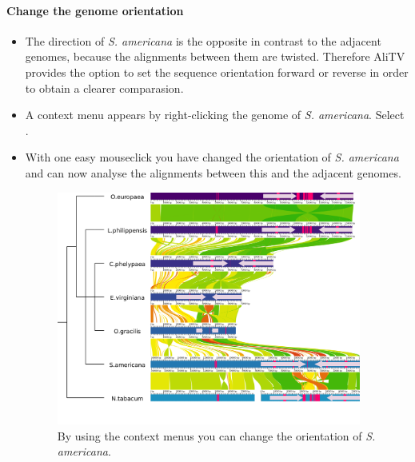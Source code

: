 \documentclass[a4paper]{scrartcl}
\begin{document}
\paragraph*{Change the genome orientation}
\begin{itemize}
	\item The direction of \emph{S. americana} is the opposite in contrast to the adjacent genomes, because the alignments between them are twisted. Therefore AliTV provides the option to set the sequence orientation forward or reverse in order to obtain a clearer comparasion. 
	\item A context menu appears by right-clicking the genome of \emph{S. americana}. Select .
	\item With one easy mouseclick you have changed the orientation of \emph{S. americana} and can now analyse the alignments between this and the adjacent genomes.
	\begin{figure}[H]
		\centering
		\includegraphics[width=10cm]{reverse.png}
		\caption{By using the context menus you can change the orientation of \emph{S. americana}.}
	\end{figure}
\end{itemize}
	
\end{document}
